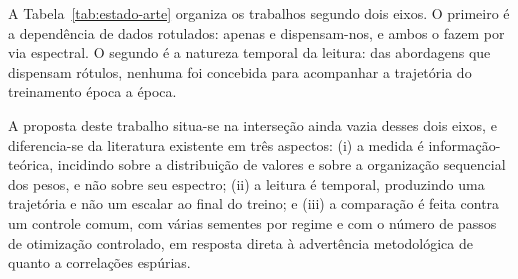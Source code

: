A Tabela~\ref{tab:estado-arte} organiza os trabalhos segundo dois eixos. O
primeiro é a dependência de dados rotulados: apenas  e
 dispensam-nos, e ambos o fazem por via espectral. O
segundo é a natureza temporal da leitura: das abordagens que dispensam rótulos,
nenhuma foi concebida para acompanhar a trajetória do treinamento época a
época.

A proposta deste trabalho situa-se na interseção ainda vazia desses dois eixos,
e diferencia-se da literatura existente em três aspectos: (i) a medida é
informação-teórica, incidindo sobre a distribuição de valores e sobre a
organização sequencial dos pesos, e não sobre seu espectro; (ii) a leitura é
temporal, produzindo uma trajetória e não um escalar ao final do treino; e
(iii) a comparação é feita contra um controle comum, com várias sementes por
regime e com o número de passos de otimização controlado, em resposta direta à
advertência metodológica de  quanto a correlações
espúrias.
